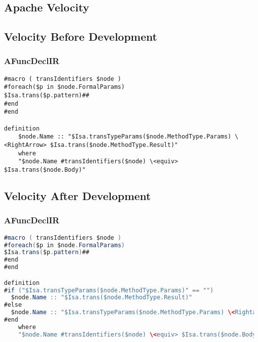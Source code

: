 \begin{appendices}
\chapter{Apache Velocity} \label{velocity}
\section{Velocity Before Development} \label{Velocitybefore}
\subsection{AFuncDeclIR}
\begin{lstlisting}[language=Velocity]
#macro ( transIdentifiers $node )
#foreach($p in $node.FormalParams)
$Isa.trans($p.pattern)##
#end
#end

definition
    $node.Name :: "$Isa.transTypeParams($node.MethodType.Params) \<RightArrow> $Isa.trans($node.MethodType.Result)"
    where
    "$node.Name #transIdentifiers($node) \<equiv> $Isa.trans($node.Body)"

\end{lstlisting}
\section{Velocity After Development} \label{Velocityafter}
\subsection{AFuncDeclIR}
\begin{lstlisting}[language=Java]
#macro ( transIdentifiers $node )
#foreach($p in $node.FormalParams)
$Isa.trans($p.pattern)##
#end
#end

definition
#if ("$Isa.transTypeParams($node.MethodType.Params)" == "")
  $node.Name :: "$Isa.trans($node.MethodType.Result)"
#else
  $node.Name :: "$Isa.transTypeParams($node.MethodType.Params) \<Rightarrow> $Isa.trans($node.MethodType.Result)"
#end
    where
    "$node.Name #transIdentifiers($node) \<equiv> $Isa.trans($node.Body)"
\end{lstlisting}


\end{appendices}
